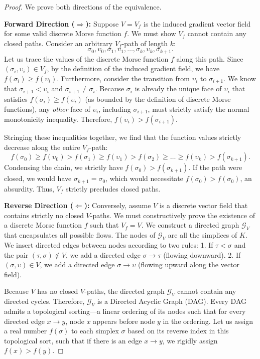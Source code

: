 \begin{proof}
We prove both directions of the equivalence.

\textbf{Forward Direction ($\Rightarrow$):} Suppose $V = V_f$ is the induced gradient vector field for some valid discrete Morse function $f$. We must show $V_f$ cannot contain any closed paths. Consider an arbitrary $V_f$-path of length $k$:
\[ \sigma_0, \upsilon_0, \sigma_1, \upsilon_1, \dots, \sigma_k, \upsilon_k, \sigma_{k+1}. \]
Let us trace the values of the discrete Morse function $f$ along this path. Since $(\sigma_i, \upsilon_i) \in V_f$, by the definition of the induced gradient field, we have $f(\sigma_i) \ge f(\upsilon_i)$. 
Furthermore, consider the transition from $\upsilon_i$ to $\sigma_{i+1}$. We know that $\sigma_{i+1} < \upsilon_i$ and $\sigma_{i+1} \neq \sigma_i$. Because $\sigma_i$ is already the unique face of $\upsilon_i$ that satisfies $f(\sigma_i) \ge f(\upsilon_i)$ (as bounded by the definition of discrete Morse functions), any \emph{other} face of $\upsilon_i$, including $\sigma_{i+1}$, must strictly satisfy the normal monotonicity inequality. Therefore, $f(\upsilon_i) > f(\sigma_{i+1})$.

Stringing these inequalities together, we find that the function values strictly decrease along the entire $V_f$-path:
\[ f(\sigma_0) \ge f(\upsilon_0) > f(\sigma_1) \ge f(\upsilon_1) > f(\sigma_2) \ge \dots \ge f(\upsilon_k) > f(\sigma_{k+1}). \]
Condensing the chain, we strictly have $f(\sigma_0) > f(\sigma_{k+1})$. If the path were closed, we would have $\sigma_{k+1} = \sigma_0$, which would necessitate $f(\sigma_0) > f(\sigma_0)$, an absurdity. Thus, $V_f$ strictly precludes closed paths.

\textbf{Reverse Direction ($\Leftarrow$):} Conversely, assume $V$ is a discrete vector field that contains strictly no closed $V$-paths. We must constructively prove the existence of a discrete Morse function $f$ such that $V_f = V$.
We construct a directed graph $\mathcal{G}_V$ that encapsulates all possible flows. The nodes of $\mathcal{G}_V$ are all the simplices of $K$. We insert directed edges between nodes according to two rules:
1. If $\tau < \sigma$ and the pair $(\tau, \sigma) \notin V$, we add a directed edge $\sigma \to \tau$ (flowing downward).
2. If $(\sigma, \upsilon) \in V$, we add a directed edge $\sigma \to \upsilon$ (flowing upward along the vector field).

Because $V$ has no closed $V$-paths, the directed graph $\mathcal{G}_V$ cannot contain any directed cycles. Therefore, $\mathcal{G}_V$ is a Directed Acyclic Graph (DAG). 
Every DAG admits a topological sorting—a linear ordering of its nodes such that for every directed edge $x \to y$, node $x$ appears before node $y$ in the ordering.
Let us assign a real number $f(\sigma)$ to each simplex $\sigma$ based on its reverse index in this topological sort, such that if there is an edge $x \to y$, we rigidly assign $f(x) > f(y)$. 


\end{proof}
